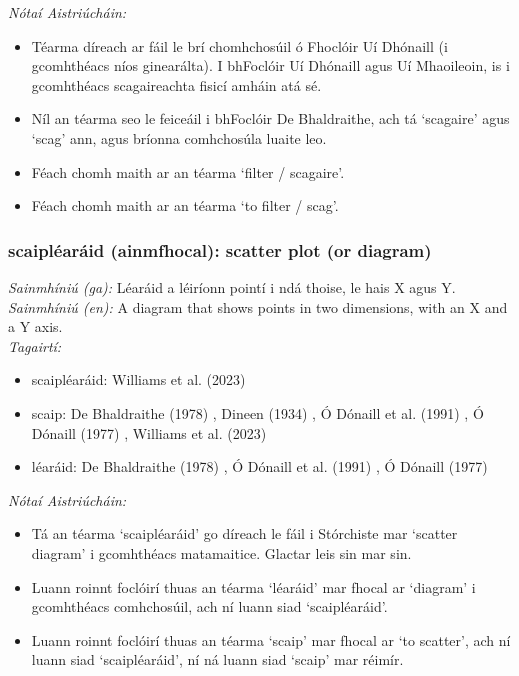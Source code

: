  \noindent \textit{Nótaí Aistriúcháin:}
\begin{itemize}
	\item Téarma díreach ar fáil le brí chomhchosúil ó Fhoclóir Uí Dhónaill (i gcomhthéacs níos ginearálta). I bhFoclóir Uí Dhónaill agus Uí Mhaoileoin, is i gcomhthéacs scagaireachta fisicí amháin atá sé.
	\item Níl an téarma seo le feiceáil i bhFoclóir De Bhaldraithe, ach tá `scagaire' agus `scag' ann, agus bríonna comhchosúla luaite leo.
	\item Féach chomh maith ar an téarma `filter / scagaire'.
	\item Féach chomh maith ar an téarma `to filter / scag'.
\end{itemize}


\subsubsection*{scaipléaráid (ainmfhocal): scatter plot (or diagram)}
 \noindent \textit{Sainmhíniú (ga):} Léaráid a léiríonn pointí i ndá thoise, le hais X agus Y.
\\
 \noindent \textit{Sainmhíniú (en):} A diagram that shows points in two dimensions, with an X and a Y axis.
\\
 \noindent \textit{Tagairtí:}
\begin{itemize}
	\item scaipléaráid: Williams et al. (2023) \cite{storchiste}
	\item scaip: De Bhaldraithe (1978) \cite{de-bhaldraithe}, Dineen (1934) \cite{dineen}, Ó Dónaill et al. (1991) \cite{focloir-beag}, Ó Dónaill (1977) \cite{odonaill}, Williams et al. (2023) \cite{storchiste}
	\item léaráid: De Bhaldraithe (1978) \cite{de-bhaldraithe}, Ó Dónaill et al. (1991) \cite{focloir-beag}, Ó Dónaill (1977) \cite{odonaill}
\end{itemize}

 \noindent \textit{Nótaí Aistriúcháin:}
\begin{itemize}
	\item Tá an téarma `scaipléaráid' go díreach le fáil i Stórchiste mar `scatter diagram' i gcomhthéacs matamaitice. Glactar leis sin mar sin.
	\item Luann roinnt foclóirí thuas an téarma `léaráid' mar fhocal ar `diagram' i gcomhthéacs comhchosúil, ach ní luann siad `scaipléaráid'.
	\item Luann roinnt foclóirí thuas an téarma `scaip' mar fhocal ar `to scatter', ach ní luann siad `scaipléaráid', ní ná luann siad `scaip' mar réimír.
\end{itemize}


